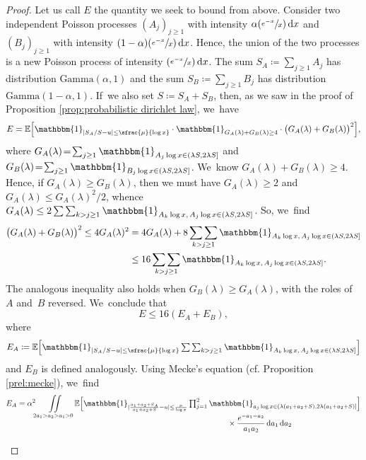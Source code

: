 \documentclass[JEP,XML,SOM,Unicode,published]{cedram}
\newcommand{\Psfrac}[2]{(\sfrac{#1}{#2})}
\newcommand{\EE}{\mathbb{E}}
\newcommand{\dee}{\,\mathrm{d}}
\newcommand{\one}{\mathbbm{1}}
\newcommand{\bg}{\big}
\newcommand{\bgg}{\Big}
\theoremstyle{plain}
\theoremstyle{definition}
\begin{document}
\begin{proof} Let us call $E$ the quantity we seek to bound from above.
Consider two independent Poisson processes $(A_j)_{j \ge 1}$ with intensity $\alpha\Psfrac{e^{-x}}{x} \dee x$ and $(B_j)_{j \ge 1}$ with intensity $(1-\alpha)\Psfrac{e^{-x}}{x} \dee x$. Hence, the union of the two processes is a new Poisson process of intensity $\Psfrac{e^{-x}}{x}\dee x$.
The sum $S_A \coloneqq \sum_{j\ge1} A_j$ has distribution $\text{Gamma}(\alpha, 1)$ and the sum $S_B \coloneqq \sum_{j\ge1} B_j$ has distribution $\text{Gamma}(1-\alpha, 1)$. If~we also set $S\coloneqq S_A+S_B$, then, as we saw in the proof of Proposition \ref{prop:probabilistic dirichlet law}, we~have
\[
E
=\EE\bgg[ \one_{| S_A/S- u |\le \sfrac{\mu}{\log x} } \cdot \one_{G_A(\lambda)+G_B(\lambda)\ge 4}\cdot \bg( G_A(\lambda)+G_B(\lambda) \bg)^2 \bgg],
\]
where $G_A(\lambda) \!=\! \sum_{j\ge1} \one_{A_j\log x\in(\lambda S,2\lambda S]}$ and $G_B(\lambda)\!=\! \sum_{j\ge1} \one_{B_j\log x\in(\lambda S,2\lambda S]}$. We~know $G_A(\lambda)+G_B(\lambda)\ge4$. Hence, if $G_A(\lambda)\ge G_B(\lambda)$, then we must have \hbox{$G_A(\lambda)\ge 2$} and $G_A(\lambda)\le G_A(\lambda)^2/2$, whence $G_A(\lambda) \le 2\mathop{\sum\sum}_{k>j\ge1} \one_{A_k\log x,\, A_j\log x\in (\lambda S,2\lambda S]}$. So, we~find
\[
\begin{split}
\bg( G_A(\lambda)+G_B(\lambda) \bg)^2 \le 4G_A(\lambda)^2
&= 4 G_A(\lambda) + 8 \mathop{\sum\sum}_{k>j\ge1} \one_{A_k\log x,\, A_j\log x\in (\lambda S,2\lambda S]} \\
&\le 16 \mathop{\sum\sum}_{k>j\ge1} \one_{A_k\log x,\, A_j\log x\in (\lambda S,2\lambda S]}.
\end{split}
\]
The analogous inequality also holds when $G_B(\lambda)\ge G_A(\lambda)$, with the roles of $A$ and~$B$ reversed. We~conclude that
\[
E
\le 16 (E_A+E_B),
\]
where
\[
E_A \coloneqq \EE\bgg[\textstyle \one_{|S_A/S - u |\le \sfrac{\mu}{\log x} } \mathop{\sum\sum}_{k>j\ge1} \one_{A_k\log x,\, A_j\log x\in (\lambda S,2\lambda S]} \bgg]
\]
and $E_B$ is defined analogously. Using Mecke's equation (cf. Proposition \ref{prel:mecke}), we~find
\[
\begin{split}
E_A &= \alpha^2\iint\limits_{2a_1>a_2>a_1>0}
\EE\bgg[\textstyle \one_{| \frac{a_1+a_2+S_A}{a_1+a_2+S} - u |\le \frac{\mu}{\log x} } \prod_{j=1}^2 \one_{a_j\log x \in (\lambda (a_1+a_2+S),2\lambda (a_1+a_2+S)]} \bgg] \\[-10pt]
&\hspace*{9.5cm} \times \frac{e^{-a_1-a_2}}{a_1a_2}\dee a_1\dee a_2 \\[6pt]

\end{split}\]
\end{proof}
\end{document}
